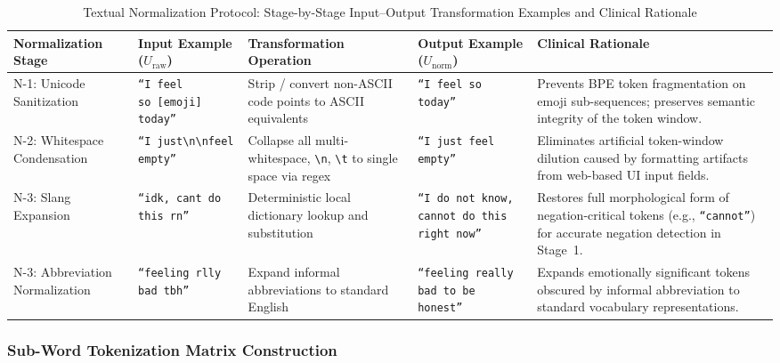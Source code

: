 \documentclass[12pt,twoside]{article}
\begin{document}
\begin{table}[htbp]
\centering
\Large
\renewcommand{\arraystretch}{2.4}
\setlength{\tabcolsep}{12pt}
\begin{adjustbox}{max width=\textwidth}
\begin{tabular}{|p{3.2cm}|p{4.5cm}|p{4.5cm}|p{5.0cm}|p{4.5cm}|}
\hline
\rowcolor{gray!20}
\textbf{Normalization Stage} & \textbf{Input Example ($U_{\text{raw}}$)} & \textbf{Transformation Operation} & \textbf{Output Example ($U_{\text{norm}}$)} & \textbf{Clinical Rationale} \\
\hline
N-1: Unicode Sanitization & \texttt{``I feel so~\textsf{[emoji]} today''} & Strip / convert non-ASCII code points to ASCII equivalents & \texttt{``I feel so today''} & Prevents BPE token fragmentation on emoji sub-sequences; preserves semantic integrity of the token window. \\
\hline
N-2: Whitespace Condensation & \texttt{``I just\textbackslash n\textbackslash nfeel empty''} & Collapse all multi-whitespace, \texttt{\textbackslash n}, \texttt{\textbackslash t} to single space via regex & \texttt{``I just feel empty''} & Eliminates artificial token-window dilution caused by formatting artifacts from web-based UI input fields. \\
\hline
N-3: Slang Expansion & \texttt{``idk, cant do this rn''} & Deterministic local dictionary lookup and substitution & \texttt{``I do not know, cannot do this right now''} & Restores full morphological form of negation-critical tokens (e.g., \texttt{``cannot''}) for accurate negation detection in Stage~1. \\
\hline
N-3: Abbreviation Normalization & \texttt{``feeling rlly bad tbh''} & Expand informal abbreviations to standard English & \texttt{``feeling really bad to be honest''} & Expands emotionally significant tokens obscured by informal abbreviation to standard vocabulary representations. \\
\hline
\end{tabular}
\end{adjustbox}
\caption{Textual Normalization Protocol: Stage-by-Stage Input--Output Transformation Examples and Clinical Rationale}
\label{tab:normalization}
\end{table}

\subsubsection{Sub-Word Tokenization Matrix Construction}
\end{document}
